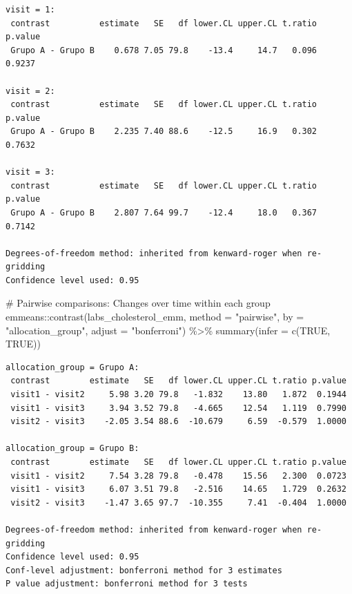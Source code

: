 \documentclass[
  12pt,
]{article}
\newenvironment{Shaded}{\begin{snugshade}}{\end{snugshade}}
\newcommand{\AttributeTok}[1]{\textcolor[rgb]{0.40,0.45,0.13}{#1}}
\newcommand{\CommentTok}[1]{\textcolor[rgb]{0.37,0.37,0.37}{#1}}
\newcommand{\ConstantTok}[1]{\textcolor[rgb]{0.56,0.35,0.01}{#1}}
\newcommand{\FunctionTok}[1]{\textcolor[rgb]{0.28,0.35,0.67}{#1}}
\newcommand{\NormalTok}[1]{\textcolor[rgb]{0.00,0.23,0.31}{#1}}
\newcommand{\SpecialCharTok}[1]{\textcolor[rgb]{0.37,0.37,0.37}{#1}}
\newcommand{\StringTok}[1]{\textcolor[rgb]{0.13,0.47,0.30}{#1}}
\begin{document}
\begin{verbatim}
visit = 1:
 contrast          estimate   SE   df lower.CL upper.CL t.ratio p.value
 Grupo A - Grupo B    0.678 7.05 79.8    -13.4     14.7   0.096  0.9237

visit = 2:
 contrast          estimate   SE   df lower.CL upper.CL t.ratio p.value
 Grupo A - Grupo B    2.235 7.40 88.6    -12.5     16.9   0.302  0.7632

visit = 3:
 contrast          estimate   SE   df lower.CL upper.CL t.ratio p.value
 Grupo A - Grupo B    2.807 7.64 99.7    -12.4     18.0   0.367  0.7142

Degrees-of-freedom method: inherited from kenward-roger when re-gridding 
Confidence level used: 0.95 
\end{verbatim}

\begin{Shaded}
\begin{Highlighting}[]
\CommentTok{\# Pairwise comparisons: Changes over time within each group}
\NormalTok{emmeans}\SpecialCharTok{::}\FunctionTok{contrast}\NormalTok{(labs\_cholesterol\_emm,}
\AttributeTok{method =} \StringTok{"pairwise"}\NormalTok{, }\AttributeTok{by =} \StringTok{"allocation\_group"}\NormalTok{,}
\AttributeTok{adjust =} \StringTok{"bonferroni"}\NormalTok{) }\SpecialCharTok{\%\textgreater{}\%} \FunctionTok{summary}\NormalTok{(}\AttributeTok{infer =} \FunctionTok{c}\NormalTok{(}\ConstantTok{TRUE}\NormalTok{, }\ConstantTok{TRUE}\NormalTok{))}
\end{Highlighting}
\end{Shaded}

\begin{verbatim}
allocation_group = Grupo A:
 contrast        estimate   SE   df lower.CL upper.CL t.ratio p.value
 visit1 - visit2     5.98 3.20 79.8   -1.832    13.80   1.872  0.1944
 visit1 - visit3     3.94 3.52 79.8   -4.665    12.54   1.119  0.7990
 visit2 - visit3    -2.05 3.54 88.6  -10.679     6.59  -0.579  1.0000

allocation_group = Grupo B:
 contrast        estimate   SE   df lower.CL upper.CL t.ratio p.value
 visit1 - visit2     7.54 3.28 79.8   -0.478    15.56   2.300  0.0723
 visit1 - visit3     6.07 3.51 79.8   -2.516    14.65   1.729  0.2632
 visit2 - visit3    -1.47 3.65 97.7  -10.355     7.41  -0.404  1.0000

Degrees-of-freedom method: inherited from kenward-roger when re-gridding 
Confidence level used: 0.95 
Conf-level adjustment: bonferroni method for 3 estimates 
P value adjustment: bonferroni method for 3 tests 
\end{verbatim}
\end{document}
